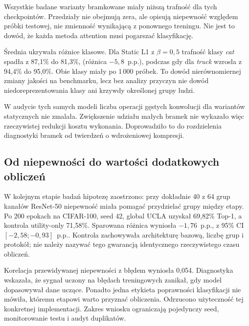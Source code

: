 \documentclass[12pt,a4paper]{article}
\newcommand{\pp}{p.p.}
\begin{document}
Wszystkie badane warianty bramkowane miały niższą trafność dla tych
checkpointów. Przedziały nie obejmują zera, ale opisują niepewność względem
próbki testowej, nie zmienność wynikającą z ponownego treningu. Nie jest to
dowód, że każda metoda attention musi pogarszać klasyfikację.

Średnia ukrywała różnice klasowe. Dla Static L1 z $\beta=0{,}5$ trafność
klasy \emph{cat} spadła z 87,1\% do 81,3\%, (różnica $-5{,}8$~\pp), podczas gdy
dla \emph{truck} wzrosła z 94,4\% do 95,0\%. Obie klasy miały po 1\,000
próbek. To dowód nierównomiernej zmiany jakości na benchmarku, lecz bez
analizy przyczyn nie dowód niedoreprezentowania klasy ani krzywdy
określonej grupy ludzi.

W audycie tych samych modeli liczba operacji gęstych konwolucji dla wariantów
statycznych nie zmalała. Zwiększenie udziału małych bramek nie wykazało więc
rzeczywistej redukcji kosztu wykonania. Doprowadziło to do rozdzielenia
diagnostyki bramek od twierdzeń o wdrożeniowej kompresji.

\subsection{Od niepewności do wartości dodatkowych obliczeń}

W kolejnym etapie badań hipotezę zaostrzono: przy dokładnie 40 z 64 grup
kanałów ResNet-50 niepewność miała pomagać przydzielać grupy między etapy.
Po 200 epokach na CIFAR-100, seed 42, global UCLA uzyskał 69,82\% Top-1,
a kontrola utility-only 71,58\%. Sparowana różnica wyniosła
$-1{,}76$~\pp, z 95\% CI $[-2{,}58;-0{,}93]$~\pp. Kontrola zachowywała
architekturę bazową, liczbę grup i protokół; nie należy nazywać tego
gwarancją identycznego rzeczywistego czasu obliczeń.

Korelacja przewidywanej niepewności z błędem wyniosła 0,054.
Diagnostyka wskazała, że sygnał uczony na błędach treningowych zanikał,
gdy model dopasowywał dane uczące. Ponadto jedna etykieta poprawności
klasyfikacji nie mówiła, któremu etapowi warto przyznać obliczenia.
Odrzucono użyteczność tej konkretnej implementacji. Zakres wniosku
ograniczają pojedynczy seed, monitorowanie testu i audyt duplikatów.
\end{document}
